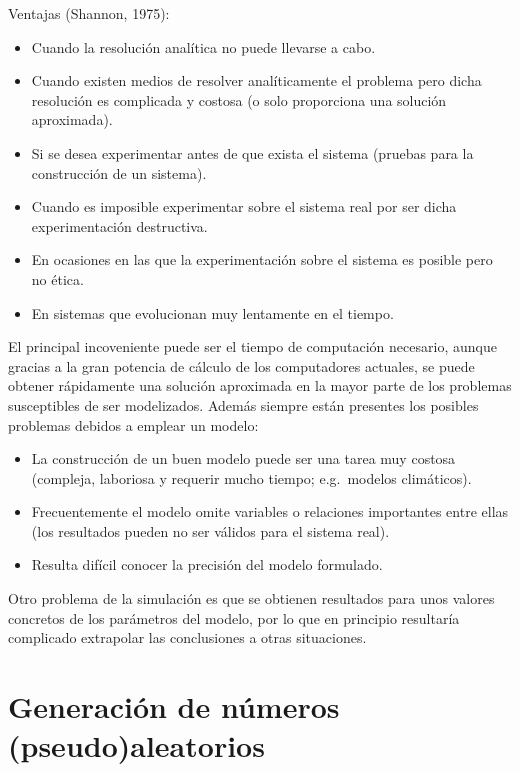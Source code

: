 \documentclass[
]{book}
\theoremstyle{break}
\theoremstyle{definition}
\theoremstyle{definition}
\theoremstyle{definition}
\theoremstyle{remark}
\begin{document}
Ventajas (Shannon, 1975):

\begin{itemize}
\item
  Cuando la resolución analítica no puede llevarse a cabo.
\item
  Cuando existen medios de resolver analíticamente el problema
  pero dicha resolución es complicada y costosa
  (o solo proporciona una solución aproximada).
\item
  Si se desea experimentar antes de que exista el sistema
  (pruebas para la construcción de un sistema).
\item
  Cuando es imposible experimentar sobre el sistema real
  por ser dicha experimentación destructiva.
\item
  En ocasiones en las que la experimentación sobre el sistema es
  posible pero no ética.
\item
  En sistemas que evolucionan muy lentamente en el tiempo.
\end{itemize}

El principal incoveniente puede ser el tiempo de computación necesario, aunque gracias a la gran potencia de cálculo de los computadores actuales, se puede obtener rápidamente una solución aproximada en la mayor parte de los problemas susceptibles de ser modelizados.
Además siempre están presentes los posibles problemas debidos a emplear un modelo:

\begin{itemize}
\item
  La construcción de un buen modelo puede ser una tarea muy costosa
  (compleja, laboriosa y requerir mucho tiempo;
  e.g.~modelos climáticos).
\item
  Frecuentemente el modelo omite variables o relaciones importantes entre ellas
  (los resultados pueden no ser válidos para el sistema real).
\item
  Resulta difícil conocer la precisión del modelo formulado.
\end{itemize}

Otro problema de la simulación es que se obtienen resultados para unos valores concretos de los parámetros del modelo, por lo que en principio
resultaría complicado extrapolar las conclusiones a otras situaciones.

\hypertarget{generaciuxf3n-de-nuxfameros-pseudoaleatorios}{%
\section{Generación de números (pseudo)aleatorios}\label{generaciuxf3n-de-nuxfameros-pseudoaleatorios}}
\end{document}
